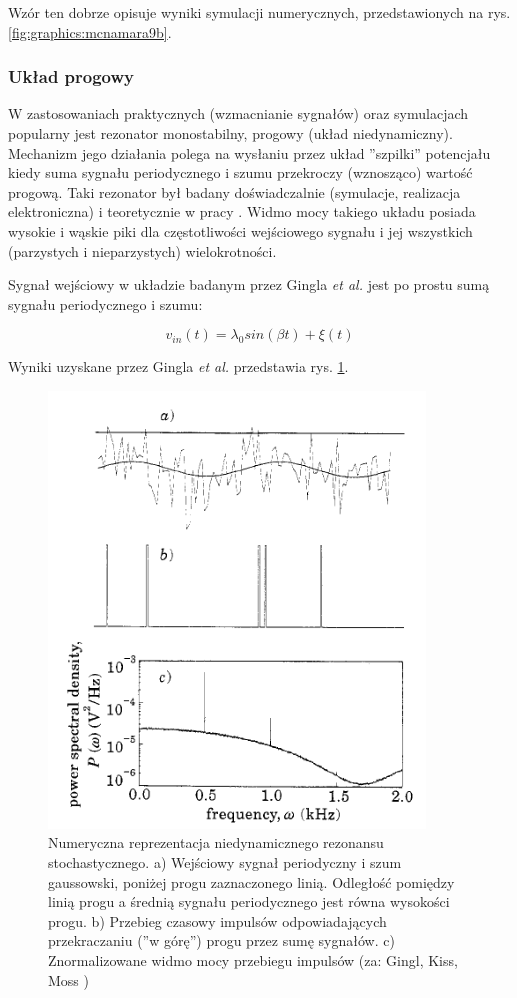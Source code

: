   Wzór ten dobrze opisuje wyniki symulacji numerycznych, przedstawionych na rys. \ref{fig:graphics:mcnamara9b}.



  \subsubsection{Układ progowy}
  \label{sec:uklad_progowy}

  W zastosowaniach praktycznych (wzmacnianie sygnałów) oraz symulacjach popularny jest rezonator monostabilny, progowy (układ niedynamiczny). Mechanizm jego działania polega na wysłaniu przez układ ''szpilki'' potencjału kiedy suma sygnału periodycznego i szumu przekroczy (wznosząco) wartość progową. Taki rezonator był badany doświadczalnie (symulacje, realizacja elektroniczna) i teoretycznie w pracy \cite{gingl_kiss_moss}. Widmo mocy takiego układu posiada wysokie i wąskie piki dla częstotliwości wejściowego sygnału i jej wszystkich (parzystych i nieparzystych) wielokrotności.

  Sygnał wejściowy w układzie badanym przez Gingla \emph{et al.} \cite{gingl_kiss_moss} jest po prostu sumą sygnału periodycznego i szumu:

  \begin{equation} \label{sr:gingl}
    v_{in}(t) = \lambda_0 sin (\beta t) + \xi(t)
  \end{equation}
  
  Wyniki uzyskane przez Gingla \emph{et al.} przedstawia rys. \ref{fig:graphics:gingl}. 

  \begin{figure}
    \includegraphics[width=100mm]{images/gingl_1.png}
    \caption{Numeryczna reprezentacja niedynamicznego rezonansu stochastycznego. a) Wejściowy sygnał periodyczny i szum gaussowski, poniżej progu zaznaczonego linią. Odległość pomiędzy linią progu a średnią sygnału periodycznego jest równa wysokości progu. b) Przebieg czasowy impulsów odpowiadających przekraczaniu (''w górę'') progu przez sumę sygnałów. c) Znormalizowane widmo mocy przebiegu impulsów (za: Gingl, Kiss, Moss \cite{gingl_kiss_moss} )}
    \label{fig:graphics:gingl}
  \end{figure}


